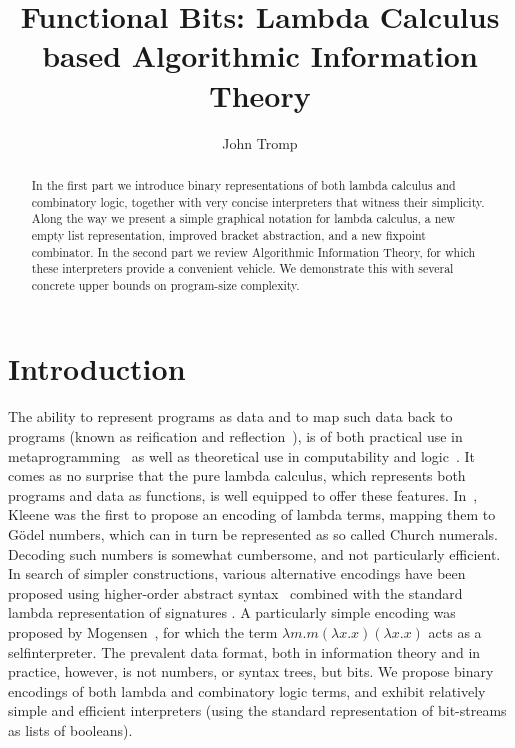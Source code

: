 \documentclass{article}
\title{Functional Bits: Lambda Calculus based Algorithmic Information Theory }
\author{John Tromp}
\begin{document}
\maketitle

\begin{abstract}
In the first part we introduce binary representations of both lambda calculus
and combinatory logic, together with very concise interpreters that witness
their simplicity. Along the way we present a simple graphical notation
for lambda calculus, a new empty list representation, improved bracket
abstraction, and a new fixpoint combinator.
In the second part we review Algorithmic Information Theory, for which
these interpreters provide a convenient vehicle.
We demonstrate this with several concrete upper bounds
on program-size complexity.
\end{abstract}

\section{Introduction}

The ability to represent programs as data and to map such data back
to programs (known as reification and reflection~\cite{fw}),
is of both practical use in
metaprogramming~\cite{dm} as well as theoretical use in computability and
logic~\cite{geb}.
It comes as no surprise that the pure lambda calculus,
which represents both programs and data as functions,
is well equipped to offer these features.
In~\cite{kl}, Kleene was the first to propose an encoding of lambda terms,
mapping them to G\"{o}del numbers, which can in turn be represented as
so called Church numerals.
Decoding such numbers is somewhat cumbersome, and not particularly efficient.
In search of simpler constructions, various alternative encodings
have been proposed using higher-order abstract syntax~\cite{PE88}
combined with the standard lambda representation of signatures \cite{SM89}.
A particularly simple encoding was proposed by Mogensen~\cite{m00},
for which the term $\lambda m.m(\lambda x.x)(\lambda x.x)$ acts as a
selfinterpreter.
The prevalent data format, both in information theory and in practice,
however, is not numbers, or syntax trees, but bits.
We propose binary encodings of both lambda and combinatory
logic terms, and exhibit relatively simple
and efficient interpreters (using the standard representation of
bit-streams as lists of booleans).
\end{document}
